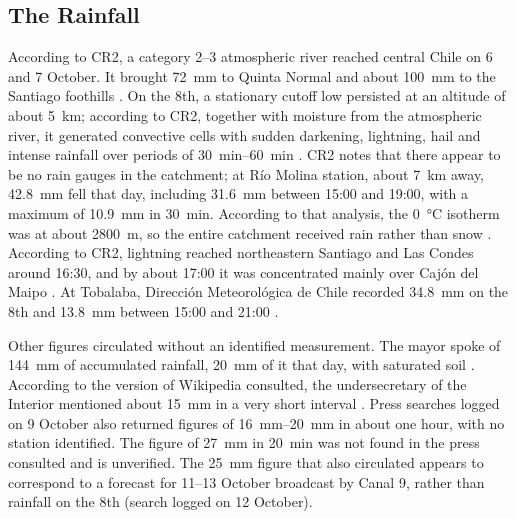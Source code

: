 \subsection*{The Rainfall}
According to CR2, a category 2--3 atmospheric river reached central Chile on 6 and 7 October. It brought \SI{72}{mm} to Quinta Normal and about \SI{100}{mm} to the Santiago foothills \citep{cr2_2026}. On the 8th, a stationary cutoff low persisted at an altitude of about \SI{5}{km}; according to CR2, together with moisture from the atmospheric river, it generated convective cells with sudden darkening, lightning, hail and intense rainfall over periods of \SIrange{30}{60}{min} \citep{cr2_2026}. CR2 notes that there appear to be no rain gauges in the catchment; at Río Molina station, about \SI{7}{km} away, \SI{42.8}{mm} fell that day, including \SI{31.6}{mm} between 15:00 and 19:00, with a maximum of \SI{10.9}{mm} in \SI{30}{min}. According to that analysis, the \SI{0}{\celsius} isotherm was at about \SI{2800}{m}, so the entire catchment received rain rather than snow \citep{cr2_2026}. According to CR2, lightning reached northeastern Santiago and Las Condes around 16:30, and by about 17:00 it was concentrated mainly over Cajón del Maipo \citep{cr2_2026}. At Tobalaba, Dirección Meteorológica de Chile recorded \SI{34.8}{mm} on the 8th and \SI{13.8}{mm} between 15:00 and 21:00 \citep{dmc2026}.

Other figures circulated without an identified measurement. The mayor spoke of \SI{144}{mm} of accumulated rainfall, \SI{20}{mm} of it that day, with saturated soil \citep{interferencia2026}. According to the version of Wikipedia consulted, the undersecretary of the Interior mentioned about \SI{15}{mm} in a very short interval \citep{wikipedia2026}. Press searches logged on 9 October also returned figures of \SIrange{16}{20}{mm} in about one hour, with no station identified. The figure of \SI{27}{mm} in \SI{20}{min} was not found in the press consulted and is unverified. The \SI{25}{mm} figure that also circulated appears to correspond to a forecast for 11--13 October broadcast by Canal 9, rather than rainfall on the 8th (search logged on 12 October).

